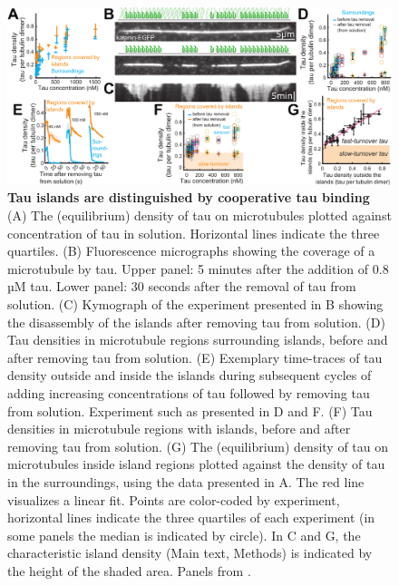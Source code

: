 \begin{figure}[h]
\centering
\includegraphics[width=1\linewidth]{Figures/tau_flushouts.png}
\caption[Tau islands are distinguished by cooperative tau binding.]{
\textbf{Tau islands are distinguished by cooperative tau binding} (A) The (equilibrium) density of tau on microtubules plotted against concentration of tau in solution. Horizontal lines indicate the three quartiles. (B) Fluorescence micrographs showing the coverage of a microtubule by tau. Upper panel: 5 minutes after the addition of 0.8 µM tau. Lower panel: 30 seconds after the removal of tau from solution. (C) Kymograph of the experiment presented in B showing the disassembly of the islands after removing tau from solution. (D) Tau densities in microtubule regions surrounding islands, before and after removing tau from solution. (E) Exemplary time-traces of tau density outside and inside the islands during subsequent cycles of adding increasing concentrations of tau followed by removing tau from solution. Experiment such as presented in D and F. (F) Tau densities in microtubule regions with islands, before and after removing tau from solution. (G) The (equilibrium) density of tau on microtubules inside island regions plotted against the density of tau in the surroundings, using the data presented in A. The red line visualizes a linear fit. Points are color-coded by experiment, horizontal lines indicate the three quartiles of each experiment (in some panels the median is indicated by circle). In C and G, the characteristic island density (Main text, Methods) is indicated by the height of the shaded area. Panels from \cite{Siahaan2019a}.
	}\label{tauflushouts}
\end{figure}

